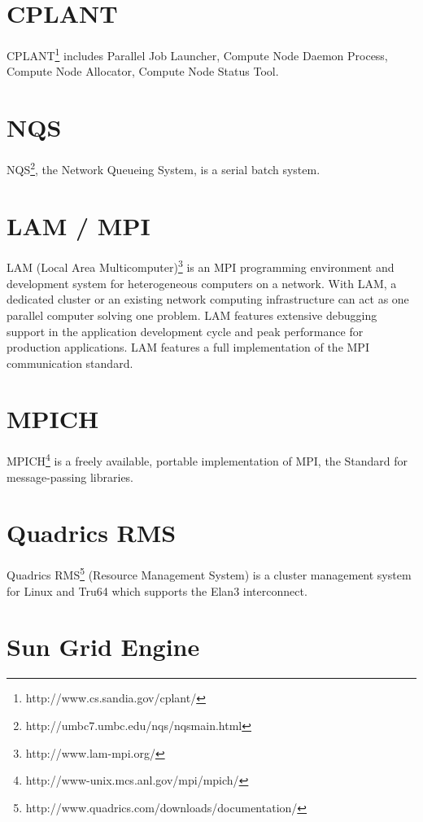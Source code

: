 \documentclass{article}
\begin{document}
\section{CPLANT}

CPLANT\footnote{http://www.cs.sandia.gov/cplant/} includes
Parallel Job Launcher, Compute Node Daemon Process,
Compute Node Allocator, Compute Node Status Tool.

\section{NQS}

NQS\footnote{http://umbc7.umbc.edu/nqs/nqsmain.html},
the Network Queueing System, is a serial batch system.

\section{LAM / MPI}

LAM (Local Area Multicomputer)\footnote{http://www.lam-mpi.org/}
is an MPI programming environment and development system for heterogeneous
computers on a network.
With LAM, a dedicated cluster or an existing network
computing infrastructure can act as one parallel computer solving
one problem.  LAM features extensive debugging support in the
application development cycle and peak performance for production
applications. LAM features a full implementation of the MPI
communication standard.

\section{MPICH}

MPICH\footnote{http://www-unix.mcs.anl.gov/mpi/mpich/}
is a freely available, portable implementation of MPI,
the Standard for message-passing libraries.

\section{Quadrics RMS}

Quadrics
RMS\footnote{http://www.quadrics.com/downloads/documentation/}
(Resource Management System) is a cluster management system for
Linux and Tru64 which supports the
Elan3 interconnect.

\section{Sun Grid Engine}
\end{document}
